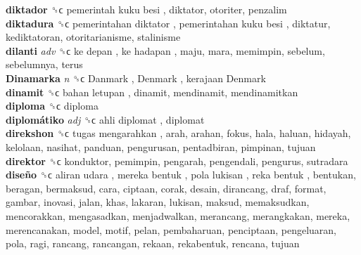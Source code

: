 \textbf{diktador} ␝ϲ   pemerintah kuku besi , diktator, otoriter, penzalim  \\
\textbf{diktadura} ␝ϲ   pemerintahan diktator ,  pemerintahan kuku besi , diktatur, kediktatoran, otoritarianisme, stalinisme  \\
\textbf{dilanti} \emph{adv}  ␝ϲ   ke depan ,  ke hadapan , maju, mara, memimpin, sebelum, sebelumnya, terus  \\
\textbf{Dinamarka} \emph{n}  ␝ϲ   Danmark ,  Denmark ,  kerajaan Denmark   \\
\textbf{dinamit} ␝ϲ   bahan letupan , dinamit, mendinamit, mendinamitkan  \\
\textbf{diploma} ␝ϲ  diploma  \\
\textbf{diplomátiko} \emph{adj}  ␝ϲ   ahli diplomat , diplomat  \\
\textbf{direkshon} ␝ϲ   tugas mengarahkan , arah, arahan, fokus, hala, haluan, hidayah, kelolaan, nasihat, panduan, pengurusan, pentadbiran, pimpinan, tujuan  \\
\textbf{direktor} ␝ϲ  konduktor, pemimpin, pengarah, pengendali, pengurus, sutradara  \\
\textbf{diseño} ␝ϲ   aliran udara ,  mereka bentuk ,  pola lukisan ,  reka bentuk , bentukan, beragan, bermaksud, cara, ciptaan, corak, desain, dirancang, draf, format, gambar, inovasi, jalan, khas, lakaran, lukisan, maksud, memaksudkan, mencorakkan, mengasadkan, menjadwalkan, merancang, merangkakan, mereka, merencanakan, model, motif, pelan, pembaharuan, penciptaan, pengeluaran, pola, ragi, rancang, rancangan, rekaan, rekabentuk, rencana, tujuan  \\
